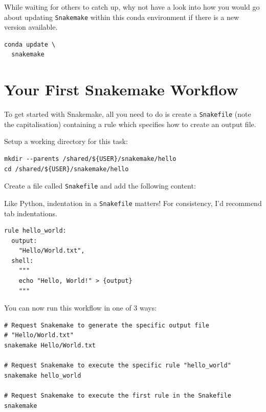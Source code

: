 \begin{bonus}

While waiting for others to catch up, why not have a look into how you would go about updating \texttt{Snakemake}
within this conda environment if there is a new version available.

\begin{answer}
\begin{lstlisting}
conda update \
  snakemake
\end{lstlisting}
\end{answer}

\end{bonus}


\section{Your First Snakemake Workflow}

To get started with Snakemake, all you need to do is create a \texttt{Snakefile} (note the capitalisation) containing a rule
which specifies how to create an output file.

Setup a working directory for this task:

\begin{lstlisting}
mkdir --parents /shared/${USER}/snakemake/hello
cd /shared/${USER}/snakemake/hello
\end{lstlisting}

Create a file called \texttt{Snakefile} and add the following content:

\begin{warning}

Like Python, indentation in a \texttt{Snakefile} matters! For consistency, I'd recommend tab indentations.

\end{warning}

\begin{lstlisting}
rule hello_world:
  output:
    "Hello/World.txt",
  shell:
    """
    echo "Hello, World!" > {output}
    """
\end{lstlisting}

You can now run this workflow in one of 3 ways:

\begin{lstlisting}
# Request Snakemake to generate the specific output file
# "Hello/World.txt"
snakemake Hello/World.txt

# Request Snakemake to execute the specific rule "hello_world"
snakemake hello_world

# Request Snakemake to execute the first rule in the Snakefile
snakemake
\end{lstlisting}


